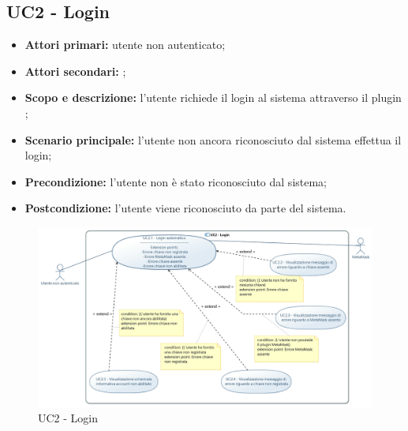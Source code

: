 \documentclass[AnalisiDeiRequisiti.tex]{subfiles}
\begin{document}
\subsection{UC2 - Login}
\begin{itemize}
	\item \textbf{Attori primari:} utente non autenticato;
	\item \textbf{Attori secondari:} ;
	\item \textbf{Scopo e descrizione:} l'utente richiede il login al sistema attraverso il plugin ;
	\item \textbf{Scenario principale:} l'utente non ancora riconosciuto dal sistema effettua il login;
	\item \textbf{Precondizione:} l'utente non è stato riconosciuto dal sistema;
	\item \textbf{Postcondizione:} l'utente viene riconosciuto da parte del sistema.\\
\end{itemize}

\begin{figure}[H]
	\centering
	\includegraphics[width=1.0\linewidth]{UC2.jpg}
	\caption{UC2 - Login}
	\label{fig:UC2 - Login}
\end{figure}
\end{document}
